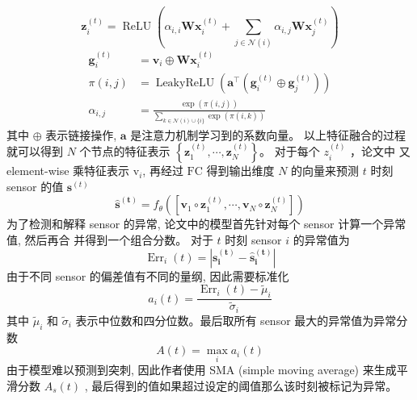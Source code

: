 \begin{equation}
    \mathbf{z}_i^{(t)}=\operatorname{ReLU}\left(\alpha_{i, i} \mathbf{W} \mathbf{x}_i^{(t)}+\sum_{j \in \mathcal{N}(i)} \alpha_{i, j} \mathbf{W} \mathbf{x}_j^{(t)}\right)
    \end{equation}
    \begin{equation}
        \begin{aligned}
        \mathbf{g}_i^{(t)} & =\mathbf{v}_i \oplus \mathbf{W} \mathbf{x}_i^{(t)} \\
        \pi(i, j) & =\operatorname{LeakyReLU}\left(\mathbf{a}^{\top}\left(\mathbf{g}_i^{(t)} \oplus \mathbf{g}_j^{(t)}\right)\right) \\
        \alpha_{i, j} & =\frac{\exp (\pi(i, j))}{\sum_{k \in \mathcal{N}(i) \cup\{i\}} \exp (\pi(i, k))}
        \end{aligned}
        \end{equation}
其中 $\oplus$ 表示链接操作, $\mathbf{a}$ 是注意力机制学习到的系数向量。
以上特征融合的过程就可以得到 $N$ 个节点的特征表示 $\left\{\mathbf{z}_1^{(t)}, \cdots, \mathbf{z}_N^{(t)}\right\} 。$ 对于每个 $z_i^{(t)}$ ，论文中 又 element-wise 乘特征表示 $\mathrm{v}_i$, 再经过 $\mathrm{FC}$ 得到输出维度 $N$ 的向量来预测 $t$ 时刻 sensor 的值 $\mathbf{s}^{(t)}$
\begin{equation}
\hat{\mathbf{s}}^{(\mathbf{t})}=f_\theta\left(\left[\mathbf{v}_1 \circ \mathbf{z}_1^{(t)}, \cdots, \mathbf{v}_N \circ \mathbf{z}_N^{(t)}\right]\right)
\end{equation}
为了检测和解释 sensor 的异常, 论文中的模型首先针对每个 sensor 计算一个异常值, 然后再合 并得到一个组合分数。
对于 $t$ 时刻 sensor $i$ 的异常值为
\begin{equation}
    \operatorname{Err}_i(t)=\left|\mathbf{s}_{\mathbf{i}}^{(\mathbf{t})}-\hat{\mathbf{s}}_{\mathbf{i}}^{(\mathbf{t})}\right|
\end{equation}
由于不同 sensor 的偏差值有不同的量纲, 因此需要标准化
\begin{equation}
a_i(t)=\frac{\operatorname{Err}_i(t)-\widetilde{\mu}_i}{\tilde{\sigma}_i}
\end{equation}
其中 $\tilde{\mu}_i$ 和 $\tilde{\sigma}_i$ 表示中位数和四分位数。最后取所有 sensor 最大的异常值为异常分数
\begin{equation}
    A(t)=\max _i a_i(t)
    \end{equation}
由于模型难以预测到突刺, 因此作者使用 SMA (simple moving average) 来生成平滑分数 $A_s(t)$ , 最后得到的值如果超过设定的阈值那么该时刻被标记为异常。

